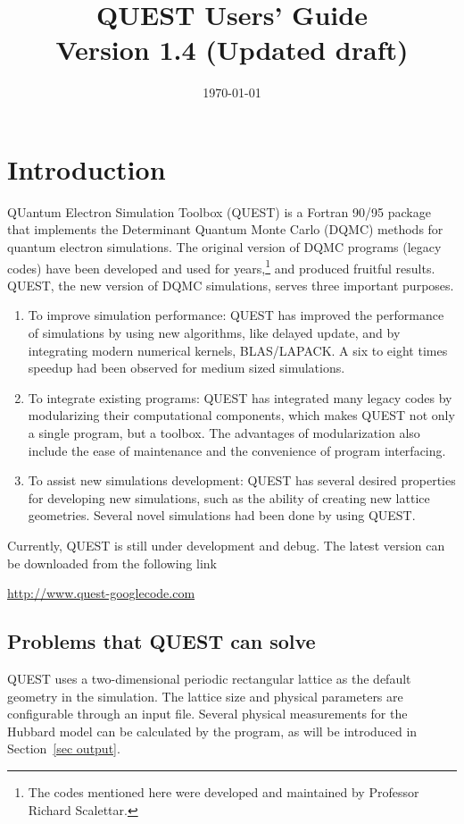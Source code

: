 \documentclass[12pt]{article}
\title{QUEST Users' Guide \\  
Version 1.4 (Updated draft)}
\date{\today}
\begin{document}
\maketitle
\newpage
\tableofcontents
\thispagestyle{empty}
\newpage
\section{Introduction}
   QUantum Electron Simulation Toolbox (QUEST) is a Fortran
   90/95 package that implements the Determinant Quantum Monte Carlo (DQMC) methods for
   quantum electron simulations.
   The original version of DQMC programs (legacy codes) have been
   developed and used for years,\footnote{The codes mentioned here were developed and maintained by Professor Richard Scalettar.} and produced fruitful results.
   QUEST, the new version of DQMC simulations, serves three important purposes.
   \begin{enumerate}
     \item To improve simulation performance: QUEST has improved the performance of simulations by using new algorithms, like delayed update, and by integrating modern numerical kernels, BLAS/LAPACK. A six to eight times speedup had been observed for medium sized simulations.
     \item To integrate existing programs: QUEST has integrated many legacy codes by modularizing their computational components, which makes QUEST not only a single program, but a toolbox. The advantages of modularization also include the ease of maintenance and the convenience of program interfacing.
     \item To assist new simulations development: QUEST has several desired properties for developing new simulations, such as the ability of creating new lattice geometries. Several novel simulations had been done by using QUEST.
   \end{enumerate}

    Currently, QUEST is still under development and debug.
    The latest version can be downloaded from the following link
    \begin{center}
    \url{http://www.quest-googlecode.com}
    \end{center}

\subsection{Problems that QUEST can solve}
    QUEST uses a two-dimensional periodic rectangular lattice as
    the default geometry in the simulation. The lattice size and physical parameters are configurable through an input file.
    Several physical measurements for the Hubbard model can be calculated by the program, as will be introduced in Section~\ref{sec output}.
\end{document}
